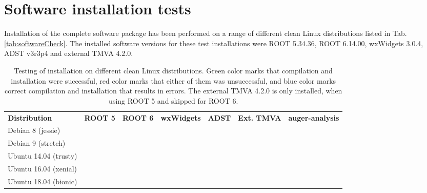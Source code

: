 \documentclass[12pt,a4paper]{report}
\begin{document}
\section{Software installation tests}
Installation of the complete software package has been performed on a range of different clean Linux distributions listed in Tab. \ref{tab:softwareCheck}. The installed software versions for these test installations were ROOT 5.34.36, ROOT 6.14.00, wxWidgets 3.0.4, ADST v3r3p4 and external TMVA 4.2.0.
\begin{table}[h]
\scriptsize
\centering
\caption{Testing of installation on different clean Linux distributions. Green color marks that compilation and installation were successful, red color marks that either of them was unsuccessful, and blue color marks correct compilation and installation that results in errors. The external TMVA 4.2.0 is only installed, when using ROOT 5 and skipped for ROOT 6.}
\vspace*{3pt}
\setlength\tabcolsep{1.5pt}
\begin{tabular}{M{0.23\textwidth}M{0.08\textwidth}||M{0.08\textwidth}||M{0.10\textwidth}||M{0.08\textwidth}||M{0.10\textwidth}||M{0.14\textwidth}}
   \toprule[1.4pt]
   \textbf{Distribution} & \textbf{ROOT 5} & \textbf{ROOT 6} & \textbf{wxWidgets} & \textbf{ADST} & \textbf{Ext. TMVA} & \textbf{auger-analysis} \\
   Debian 8 (jessie) &  &  &  &  &  &  \\
   Debian 9 (stretch) &  &  &  &  & &  \\
   Ubuntu 14.04 (trusty) &  &  &  &  &  &  \\
   Ubuntu 16.04 (xenial) &  &  &  &  &  &  \\
   Ubuntu 18.04 (bionic) &  &  &  &  & &  \\

\end{tabular}
\end{table}
\end{document}
